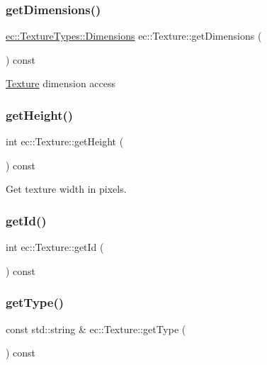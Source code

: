 \subsubsection{\texorpdfstring{get\+Dimensions()}{getDimensions()}}
{\footnotesize\ttfamily \mbox{\hyperlink{structec_1_1_texture_types_ac0e07f24452fa28dd8e6e33a224842fc}{ec\+::\+Texture\+Types\+::\+Dimensions}} ec\+::\+Texture\+::get\+Dimensions (\begin{DoxyParamCaption}{ }\end{DoxyParamCaption}) const}

\mbox{\hyperlink{classec_1_1_texture}{Texture}} dimension access \mbox{\label{classec_1_1_texture_a45ff89dd7453c2d09ec10ba8aa58835c}} 
\subsubsection{\texorpdfstring{get\+Height()}{getHeight()}}
{\footnotesize\ttfamily int ec\+::\+Texture\+::get\+Height (\begin{DoxyParamCaption}{ }\end{DoxyParamCaption}) const}

Get texture width in pixels. \mbox{\label{classec_1_1_texture_a0097b0b1826d7339ae109a187b6304d5}} 
\subsubsection{\texorpdfstring{get\+Id()}{getId()}}
{\footnotesize\ttfamily int ec\+::\+Texture\+::get\+Id (\begin{DoxyParamCaption}{ }\end{DoxyParamCaption}) const}

\mbox{\label{classec_1_1_texture_a1c33bc610c0b5c7807fa92897320349f}} 
\subsubsection{\texorpdfstring{get\+Type()}{getType()}}
{\footnotesize\ttfamily const std\+::string \& ec\+::\+Texture\+::get\+Type (\begin{DoxyParamCaption}{ }\end{DoxyParamCaption}) const}

